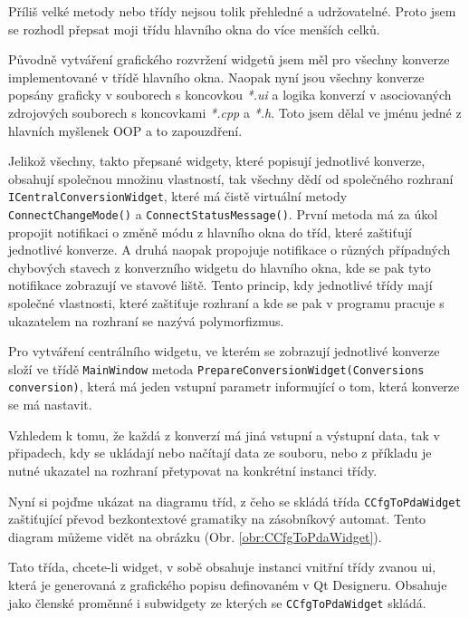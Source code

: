 
Příliš velké metody nebo třídy nejsou tolik přehledné a udržovatelné. Proto jsem se rozhodl přepsat moji třídu hlavního okna do více menších celků.

Původně vytváření grafického rozvržení widgetů jsem měl pro všechny konverze implementované v třídě hlavního okna. Naopak nyní jsou všechny konverze popsány graficky v souborech s koncovkou \textit{*.ui} a logika konverzí v asociovaných zdrojových souborech s koncovkami \textit{*.cpp} a \textit{*.h}. Toto jsem dělal ve jménu jedné z hlavních myšlenek OOP a to zapouzdření.

Jelikož všechny, takto přepsané widgety, které popisují jednotlivé konverze, obsahují společnou množinu vlastností, tak všechny dědí od společného rozhraní \\ \texttt{ICentralConversionWidget}, které má čistě virtuální metody \texttt{ConnectChangeMode()} a \texttt{ConnectStatusMessage()}. První metoda má za úkol propojit notifikaci o změně módu z hlavního okna do tříd, které zaštiťují jednotlivé konverze. A druhá naopak propojuje notifikace o různých případných chybových stavech z konverzního widgetu do hlavního okna, kde se pak tyto notifikace zobrazují ve stavové liště. Tento princip, kdy jednotlivé třídy mají společné vlastnosti, které zaštiťuje rozhraní a kde se pak v programu pracuje s ukazatelem na rozhraní se nazývá polymorfizmus.

Pro vytváření centrálního widgetu, ve kterém se zobrazují jednotlivé konverze složí ve třídě \texttt{MainWindow} metoda \texttt{PrepareConversionWidget(Conversions conversion)}, která má jeden vstupní parametr informující o tom, která konverze se má nastavit.

Vzhledem k tomu, že každá z konverzí má jiná vstupní a výstupní data, tak v připadech, kdy se ukládají nebo načítají data ze souboru, nebo z příkladu je nutné ukazatel na rozhraní přetypovat na konkrétní instanci třídy.


Nyní si pojďme ukázat na diagramu tříd, z čeho se skládá třída \texttt{CCfgToPdaWidget} zaštiťující převod bezkontextové gramatiky na zásobníkový automat. Tento diagram můžeme vidět na obrázku (Obr. \ref{obr:CCfgToPdaWidget}).


Tato třída, chcete-li widget, v sobě obsahuje instanci vnitřní třídy zvanou ui, která je generovaná z grafického popisu definovaném v Qt Designeru. Obsahuje jako členské proměnné i subwidgety ze kterých se \texttt{CCfgToPdaWidget} skládá.

